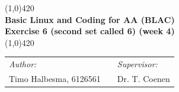 \documentclass[a4paper]{article}
\begin{document}
\begin{center}
\line(1,0){420} \\
\huge \textbf{Basic Linux and Coding for AA (BLAC) \\ Exercise 6 (second set called 6) (week 4)} \\
\line(1,0){420}
\end{center}

\vfill



\begin{table}[h]
\begin{center}
\begin{tabular}{lp{5cm}l}
\textit{Author:} & & \emph{Supervisor:} \\
Timo Halbesma, 6126561 & & Dr. T. Coenen\\
\end{tabular}
\end{center}
\end{table}


\newpage



\newpage



\newpage


\newpage


\newpage

\end{document}
